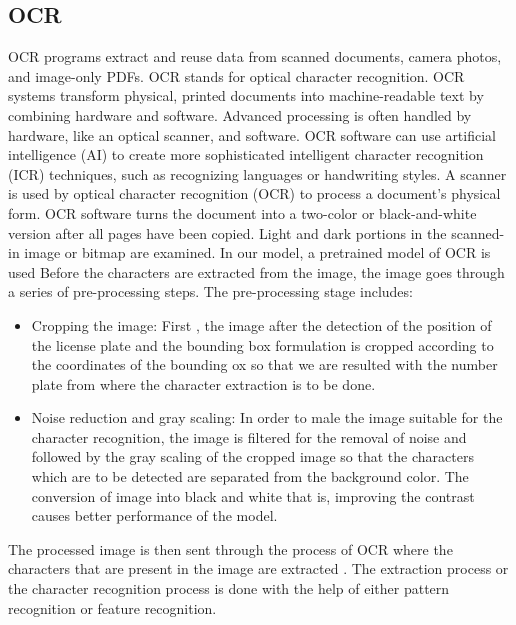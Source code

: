 \subsection*{OCR}
OCR programs extract and reuse data from scanned documents, camera photos, and image-only PDFs. OCR stands for optical character recognition.
OCR systems transform physical, printed documents into machine-readable text by combining hardware and software. Advanced processing is often handled by hardware, like an optical scanner, and software.
OCR software can use artificial intelligence (AI) to create more sophisticated intelligent character recognition (ICR) techniques, such as recognizing languages or handwriting styles. A scanner is used by optical character recognition (OCR) to process a document's physical form. OCR software turns the document into a two-color or black-and-white version after all pages have been copied. Light and dark portions in the scanned-in image or bitmap are examined. 
In our model, a pretrained model of OCR is used
Before the characters are extracted from the image, the image goes through a series of pre-processing steps. The pre-processing stage includes:
\begin{itemize}
	\item Cropping the image: First , the image after the detection of the position of the license plate and the bounding box formulation is cropped according to the coordinates of the bounding ox so that we are resulted with  the number plate from where the character extraction is to be done.
	\item Noise reduction and gray scaling: In order to male the image suitable for the character recognition, the image is filtered for the removal of noise and followed by the gray scaling of the cropped image so that the characters which are to be detected are separated from the background color. The conversion of image into black and white that is, improving the contrast causes better performance of the model.
\end{itemize}
The processed image is then sent through the process of OCR where the characters that are present in the image are extracted . The extraction process or the character recognition process is done with the help of either pattern recognition or feature recognition.
